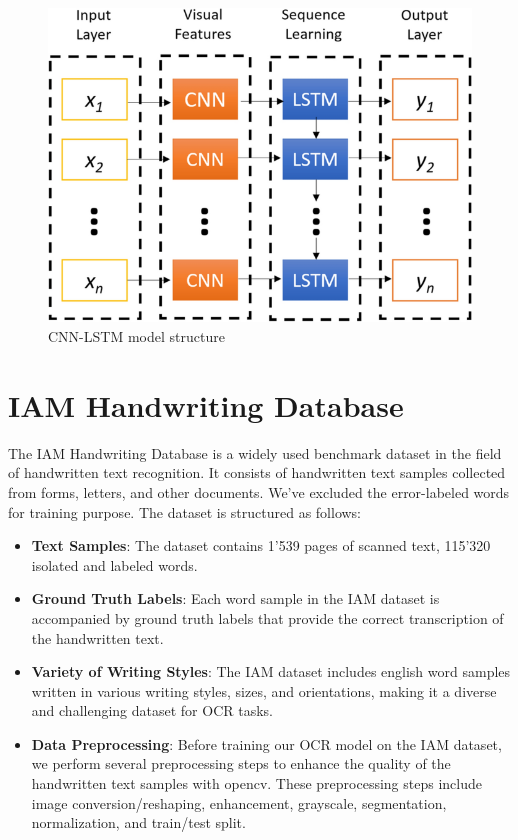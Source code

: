 \documentclass{article}
\begin{document}
\begin{figure}
    \centering
    \includegraphics[width=0.5\linewidth]{41598_2021_93656_Fig2_HTML.png}
    \caption{CNN-LSTM model structure}
    \label{fig:enter-label}
\end{figure}

\section{IAM Handwriting Database}

The IAM Handwriting Database is a widely used benchmark dataset in the field of handwritten text recognition. It consists of handwritten text samples collected from forms, letters, and other documents. We've excluded the error-labeled words for training purpose. The dataset is structured as follows:

\begin{itemize}
    \item \textbf{Text Samples}: The dataset contains 1'539 pages of scanned text, 115'320 isolated and labeled words.
    
    \item \textbf{Ground Truth Labels}: Each word sample in the IAM dataset is accompanied by ground truth labels that provide the correct transcription of the handwritten text.
    
    \item \textbf{Variety of Writing Styles}: The IAM dataset includes english word samples written in various writing styles, sizes, and orientations, making it a diverse and challenging dataset for OCR tasks.
    
    \item \textbf{Data Preprocessing}: Before training our OCR model on the IAM dataset, we perform several preprocessing steps to enhance the quality of the handwritten text samples with opencv. These preprocessing steps include image conversion/reshaping, enhancement, grayscale, segmentation, normalization, and train/test split.
\end{itemize}
\end{document}
